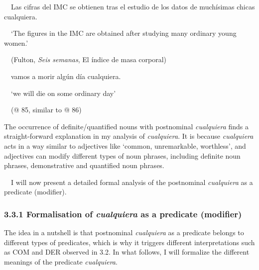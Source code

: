 \begin{styleStandard}
\label{bkm:Ref63546096}\ \ Las cifras del IMC se obtienen tras el estudio de los datos de muchísimas chicas cualquiera.
\end{styleStandard}

\begin{styleStandard}
\ \ ‘The figures in the IMC are obtained after studying many ordinary young women.’
\end{styleStandard}

\begin{styleStandard}
\ \ (Fulton, \textit{Seis semanas}, El índice de masa corporal)
\end{styleStandard}

\begin{styleStandard}
\ \ vamos a morir algún día cualquiera. 
\end{styleStandard}

\begin{styleStandard}
\ \ ‘we will die on some ordinary day’
\end{styleStandard}

\begin{styleStandard}
\ \ (@ 85, similar to @ 86)
\end{styleStandard}

\begin{styleStandard}
The occurrence of definite/quantified nouns with postnominal \textit{cualquiera} finds a straight-forward explanation in my analysis of \textit{cualquiera}. It is because \textit{cualquiera} acts in a way similar to adjectives like ‘common, unremarkable, worthless’, and adjectives can modify different types of noun phrases, including definite noun phrases, demonstrative and quantified noun phrases. 
\end{styleStandard}

\begin{styleStandard}
\ \ I will now present a detailed formal analysis of the postnominal \textit{cualquiera} as a predicate (modifier). 
\end{styleStandard}

\subsubsection[3.3.1 Formalisation of cualquiera as a predicate (modifier) ]{\textbf{3.3.1 Formalisation of }\textbf{\textit{cualquiera}}\textbf{ as a predicate}\textbf{ (modifier)}\textbf{ }}
\begin{styleStandard}
The idea in a nutshell is that postnominal \textit{cualquiera} as a predicate belongs to different types of predicates, which is why it triggers different interpretations such as COM and DER observed in 3.2. In what follows, I will formalize the different meanings of the predicate \textit{cualquiera}. 
\end{styleStandard}

